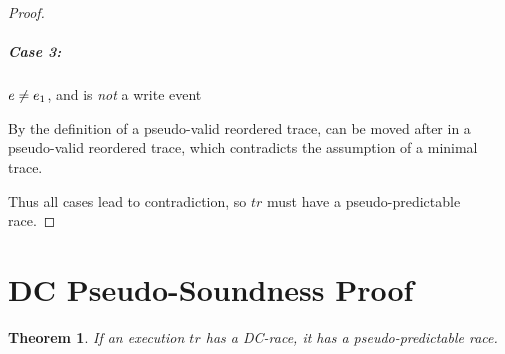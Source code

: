 \documentclass[letter,10pt]{article}
\newtheorem{thm}{Theorem}
\newcommand{\tr}{\ensuremath{\mathit{tr}}\xspace}
\newcommand{\trPrime}{\ensuremath{\mathit{tr'}}\xspace}
\newcommand{\PO}{PO\xspace}
\newcommand{\WDC}{DC\xspace}
\newcommand{\DC}{\WDC}
\newcommand{\ltPO}{\ensuremath{\prec_\textsc{\tiny{\PO}}}\xspace}
\newcommand{\Ordered}[3]{\ensuremath{#1 #2 #3}}
\newcommand{\POOrdered}[2]{\Ordered{#1}{\ltPO}{#2}}
\begin{document}
\begin{proof}
\subparagraph{Case 3:}
$\event{e} \ne \event{e}{_1}$, and  is \emph{not} a write event

By the definition of a pseudo-valid reordered trace,
 can be moved after  in a pseudo-valid reordered trace,
which contradicts the assumption of a minimal trace.


\medskip
\noindent
Thus all cases lead to contradiction, so \tr must have a pseudo-predictable race.
\end{proof}


\section{\DC Pseudo-Soundness Proof}

\begin{thm}
  If an execution \tr has a \DC-race,
  it has a pseudo-predictable race.
\label{thm:dc-pseudo-sound}
\end{thm}
\end{document}
